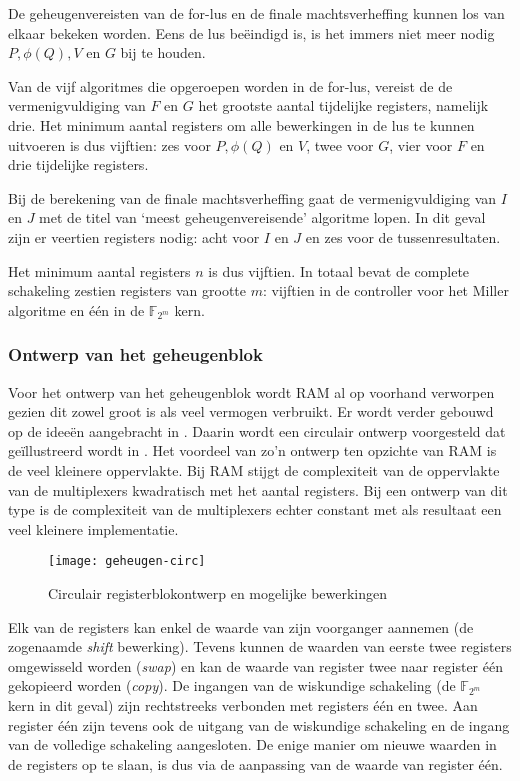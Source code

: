 De geheugenvereisten van de for-lus en de finale machtsverheffing kunnen los van elkaar bekeken worden. Eens de lus be\"eindigd is, is het immers niet meer nodig $P, \phi(Q), V$ en $G$ bij te houden.

Van de vijf algoritmes die opgeroepen worden in de for-lus, vereist de de vermenigvuldiging van $F$ en $G$ het grootste aantal tijdelijke registers, namelijk drie. Het minimum aantal registers om alle bewerkingen in de lus te kunnen uitvoeren is dus vijftien: zes voor $P, \phi(Q)$ en $V$, twee voor $G$, vier voor $F$ en drie tijdelijke registers.

Bij de berekening van de finale machtsverheffing gaat de vermenigvuldiging van $I$ en $J$ met de titel van `meest geheugenvereisende' algoritme lopen. In dit geval zijn er veertien registers nodig: acht voor $I$ en $J$ en zes voor de tussenresultaten.

Het minimum aantal registers $n$ is dus vijftien. In totaal bevat de complete schakeling zestien registers van grootte $m$: vijftien in de controller voor het Miller algoritme en \'e\'en in de $\mathbb{F}_{2^m}$ kern.

\subsubsection{Ontwerp van het geheugenblok}

Voor het ontwerp van het geheugenblok wordt RAM al op voorhand verworpen gezien dit zowel groot is als veel vermogen verbruikt. Er wordt verder gebouwd op de idee\"en aangebracht in \cite{lee}. Daarin wordt een circulair ontwerp voorgesteld dat ge\"illustreerd wordt in . Het voordeel van zo'n ontwerp ten opzichte van RAM is de veel kleinere oppervlakte. Bij RAM stijgt de complexiteit van de oppervlakte van de multiplexers kwadratisch met het aantal registers. Bij een ontwerp van dit type is de complexiteit van de multiplexers echter constant met als resultaat een veel kleinere implementatie.

\begin{figure}[h]
	\centering
		\texttt{[image: geheugen-circ]}
		\caption{Circulair registerblokontwerp en mogelijke bewerkingen\label{figuur-implementatie-miller-geheugen-circ}}
\end{figure}

Elk van de registers kan enkel de waarde van zijn voorganger aannemen (de zogenaamde \emph{shift} bewerking). Tevens kunnen de waarden van eerste twee registers omgewisseld worden (\emph{swap}) en kan de waarde van register twee naar register \'e\'en gekopieerd worden (\emph{copy}). De ingangen van de wiskundige schakeling (de $\mathbb{F}_{2^m}$ kern in dit geval) zijn rechtstreeks verbonden met registers \'e\'en en twee. Aan register \'e\'en zijn tevens ook de uitgang van de wiskundige schakeling en de ingang van de volledige schakeling aangesloten. De enige manier om nieuwe waarden in de registers op te slaan, is dus via de aanpassing van de waarde van register \'e\'en. %


